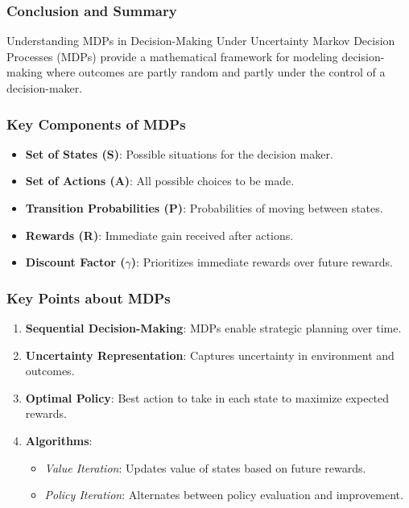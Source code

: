 \documentclass[aspectratio=169]{beamer}
\begin{document}
\begin{frame}[fragile]
    \frametitle{Conclusion and Summary}
    \begin{block}{Understanding MDPs in Decision-Making Under Uncertainty}
        Markov Decision Processes (MDPs) provide a mathematical framework for modeling decision-making where outcomes are partly random and partly under the control of a decision-maker.
    \end{block}
\end{frame}

\begin{frame}[fragile]
    \frametitle{Key Components of MDPs}
    \begin{itemize}
        \item \textbf{Set of States (S)}: Possible situations for the decision maker.
        \item \textbf{Set of Actions (A)}: All possible choices to be made.
        \item \textbf{Transition Probabilities (P)}: Probabilities of moving between states.
        \item \textbf{Rewards (R)}: Immediate gain received after actions.
        \item \textbf{Discount Factor ($\gamma$)}: Prioritizes immediate rewards over future rewards.
    \end{itemize}
\end{frame}

\begin{frame}[fragile]
    \frametitle{Key Points about MDPs}
    \begin{enumerate}
        \item \textbf{Sequential Decision-Making}: MDPs enable strategic planning over time.
        \item \textbf{Uncertainty Representation}: Captures uncertainty in environment and outcomes.
        \item \textbf{Optimal Policy}: Best action to take in each state to maximize expected rewards.
        \item \textbf{Algorithms}: 
        \begin{itemize}
            \item \textit{Value Iteration}: Updates value of states based on future rewards.
            \item \textit{Policy Iteration}: Alternates between policy evaluation and improvement.
        \end{itemize}
    \end{enumerate}
\end{frame}
\end{document}
